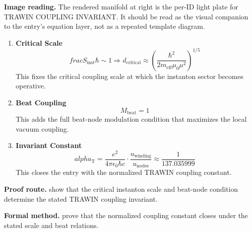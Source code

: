 \begin{samepage}
\noindent\begin{minipage}[t]{0.45\linewidth}
\vspace{0pt}
\raggedright
\scriptsize\textbf{Image reading.} The rendered manifold at right is the per-ID light plate for TRAWIN COUPLING INVARIANT. It should be read as the visual companion to the entry's equation layer, not as a repeated template diagram.\par
\end{minipage}\hfill
\begin{minipage}[t]{0.53\linewidth}
\vspace*{-0.10in}
\raggedright
{}
\end{minipage}
\end{samepage}

\clearpage


\begin{enumerate}[leftmargin=1.6em,itemsep=9pt,topsep=6pt]
\item \textbf{Critical Scale}
\[
frac{S_{\mathrm{inst}}}{\hbar}\sim 1 \Rightarrow d_{\mathrm{critical}}\approx \left(\frac{\hbar^{2}}{2m_{\mathrm{eff}}\mu_{0}\mu^{2}}\right)^{1/5}
\]
This fixes the critical coupling scale at which the instanton sector becomes operative.

\item \textbf{Beat Coupling}
\[
M_{\mathrm{beat}}=1
\]
This adds the full beat-node modulation condition that maximizes the local vacuum coupling.

\item \textbf{Invariant Constant}
\[
alpha_{\mathrm{T}}=\frac{e^{2}}{4\pi\epsilon_{0}\hbar c}\cdot \frac{ u_{\mathrm{winding}}}{ u_{\mathrm{nodes}}}\approx \frac{1}{137.035999}
\]
This closes the entry with the normalized TRAWIN coupling constant.
\end{enumerate}

\textbf{Proof route.} show that the critical instanton scale and beat-node condition determine the stated TRAWIN coupling invariant.

\textbf{Formal method.} prove that the normalized coupling constant closes under the stated scale and beat relations.

\medskip
{}

